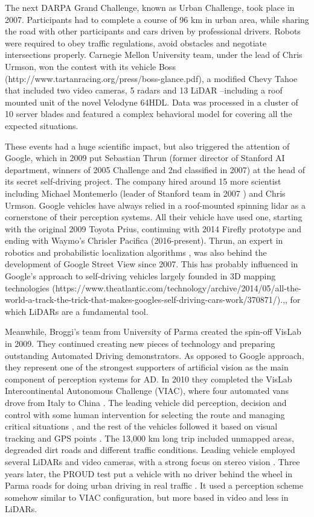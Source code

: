 The next DARPA Grand Challenge, known as Urban Challenge, took place in 2007.
Participants had to complete a course of 96 km in urban area, while sharing the
road with other participants and cars driven by professional drivers. Robots
were required to obey traffic regulations, avoid obstacles and negotiate 
intersections properly. Carnegie Mellon University team, under the lead of
Chris Urmson, won the contest with 
its vehicle Boss (http://www.tartanracing.org/press/boss-glance.pdf), a 
modified Chevy Tahoe that included two video cameras, 
5 radars and 13 LiDAR --including a roof mounted unit of the novel Velodyne
64HDL. Data was processed in a cluster of 10 server blades and featured
a complex behavioral model \cite{Urmson2007} for covering all the expected
situations.

These events had a huge scientific impact, but also triggered the attention of
Google, which in 2009 put Sebastian Thrun (former director of Stanford AI 
department, winners of 2005 Challenge and 2nd classified in 2007) at the 
head of its secret self-driving project. 
The company hired around 15 more scientist including Michael Montemerlo 
\cite{Montemerlo2003a} (leader of Stanford team in 2007 \cite{Montemerlo2008}) 
and Chris Urmson.
Google vehicles have always relied in a roof-mounted spinning lidar as 
a cornerstone of their perception systems. All their vehicle have used one, 
starting with the original 2009 Toyota Prius, continuing with 2014 Firefly
prototype and ending with Waymo's Chrisler Pacifica (2016-present).
Thrun, an expert in robotics and probabilistic localization algorithms
\cite{Levinson2011}, 
was also behind the development of Google Street View since 2007. 
This has probably influenced in Google's approach to self-driving vehicles 
largely founded in 3D mapping technologies 
(https://www.theatlantic.com/technology/archive/2014/05/all-the-world-a-track-the-trick-that-makes-googles-self-driving-cars-work/370871/).,,
 for which LiDARs are a fundamental tool.
 
 
Meanwhile, Broggi's team from University of Parma created the spin-off VisLab
in 2009. They continued creating new pieces of technology and preparing 
outstanding Automated Driving demonstrators. As opposed to Google approach,
they represent one of the strongest supporters of artificial vision as the main 
component of perception systems for AD. In 2010 they 
completed the VisLab Intercontinental Autonomous Challenge (VIAC), where
four automated vans drove from Italy to China \cite{Bertozzi2011}.
The leading vehicle did perception, decision and control with some human 
intervention for selecting the route and managing critical situations
\cite{Broggi2012a}, and the rest of the vehicles followed it based on visual
tracking and GPS points \cite{Broggi2012a}. 
The 13,000 km long trip included unmapped areas, degreaded dirt roads and
different traffic conditions. Leading vehicle employed several LiDARs and
video cameras, with a strong focus on stereo vision \cite{Broggi2011}.
Three years later, the PROUD test put a vehicle with no driver behind the
wheel in Parma roads for doing urban driving in real traffic 
\cite{Broggi2013}. 
It used a perception scheme somehow similar to VIAC configuration, but more 
based in video and less in LiDARs.
 
